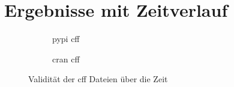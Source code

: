 \section{Ergebnisse mit Zeitverlauf}
\label{sec:gesamtheit_ergebnisse}
\begin{figure}
    \begin{subfigure}{.5\textwidth}
        \centering
        
        \caption{\gls{pypi} \gls{cff}}
        \label{fig:valid_cff_by_time_pypi_cff}
    \end{subfigure}%
    \begin{subfigure}{.5\textwidth}
        \centering
        
        \caption{\gls{cran} \gls{cff}}
        \label{fig:valid_cff_by_time_cran_cff}
    \end{subfigure}
    \caption{Validität der \gls{cff} Dateien über die Zeit}
    \label{fig:valid_cff_by_time}
    \small
    \raggedright
\end{figure}

